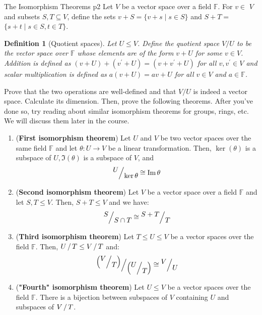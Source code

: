 \documentclass[a4paper, 11pt]{article}
\newtheorem*{definition*}{Definition}
\begin{document}
\begin{problem}{%
		The Isomorphism Theorems
	}{p2%
	}
Let $V$ be a vector space over a field $\mathbb{F}$. For $v \in$ $V$ and subsets $S, T \subseteq V$, define the sets $v+S=\{v+s \mid s \in S\}$ and $S+T=$ $\{s+t \mid s \in S, t \in T\}$.

\begin{definition*}[Quotient spaces]
	 Let $U \leq V$. Define the quotient space $V / U$ to be the vector space over $\mathbb{F}$ whose elements are of the form $v+U$ for some $v \in V$. Addition is defined as $(v+U)+\left(v^{\prime}+U\right)=\left(v+v^{\prime}+U\right)$ for all $v, v^{\prime} \in V$ and scalar multiplication is defined as $a(v+U)=a v+U$ for all $v \in V$ and $a \in \mathbb{F}$.

\end{definition*}
Prove that the two operations are well-defined and that $V / U$ is indeed a vector space. Calculate its dimension. Then, prove the following theorems. After you've done so, try reading about similar isomorphism theorems for groups, rings, etc. We will discuss them later in the course.
\begin{enumerate}[label=(\alph*)]
\item (\textbf{First isomorphism theorem}) Let $U$ and $V$ be two vector spaces over the same field $\mathbb{F}$ and let $\theta: U \rightarrow V$ be a linear transformation. Then, $\ker(\theta)$ is a subspace of $U, \Im(\theta)$ is a subspace of $V$, and
$$
\quotient{U}{\ker \theta} \cong \Im\theta
$$
\item (\textbf{Second isomorphism theorem}) Let $V$ be a vector space over a field $\mathbb{F}$ and let $S, T \leq V$. Then, $S+T \leq V$ and we have:
$$
\quotient{S}{S\cap T}\cong \quotient{S+T}{T}
$$
\item (\textbf{Third isomorphism theorem}) Let $T \leq U \leq V$ be a vector spaces over the field $\mathbb{F}$. Then, $\quotient{U}{T}\leq \quotient{V}{T}$ and:
$$
\quotient{\lt(\quotient{V}{T}\rt)}{\lt(\quotient{U}{T}\rt)}\cong \quotient{V}{U}
$$
\item (\textbf{"Fourth" isomorphism theorem}) Let $U \leq V$ be a vector spaces over the field $\mathbb{F}$. There is a bijection between subspaces of $V$ containing $U$ and subspaces of $\quotient{V}{T}$.
\end{enumerate}
\end{problem}
\end{document}
